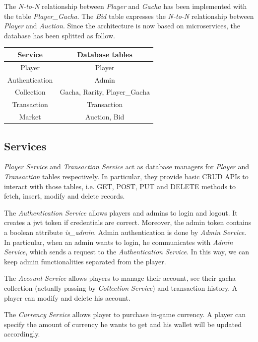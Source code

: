 \documentclass{article}
\begin{document}
The \emph{N-to-N} relationship between \emph{Player} and \emph{Gacha} has been implemented with the table \emph{Player\_Gacha}. The \emph{Bid} table expresses the \emph{N-to-N} relationship between \emph{Player} and \emph{Auction}. Since the architecture is now based on microservices, the database has been splitted as follow.
\begin{table}[ht!]
    \centering
    \begin{tabular}{|c|c|}
        \hline
        \textbf{Service} & \textbf{Database tables}     \\
        \hline
        Player           & Player                       \\
        Authentication   & Admin                        \\
        Collection       & Gacha, Rarity, Player\_Gacha \\
        Transaction      & Transaction                  \\
        Market           & Auction, Bid                 \\
        \hline
    \end{tabular}
\end{table}

\subsection{Services}
\emph{Player Service} and \emph{Transaction Service} act as database managers for \emph{Player} and \emph{Transaction} tables respectively. In particular, they provide basic CRUD APIs to interact with those tables, i.e. GET, POST, PUT and DELETE methods to fetch, insert, modify and delete records.

The \emph{Authentication Service} allows players and admins to login and logout. It creates a jwt token if credentials are correct. Moreover, the admin token contains a boolean attribute \emph{is\_admin}. Admin authentication is done by \emph{Admin Service}. In particular, when an admin wants to login, he communicates with \emph{Admin Service}, which sends a request to the \emph{Authentication Service}. In this way, we can keep admin functionalities separated from the player.

The \emph{Account Service} allows players to manage their account, see their gacha collection (actually passing by \emph{Collection Service}) and transaction history. A player can modify and delete his account.

The \emph{Currency Service} allows player to purchase in-game currency. A player can specify the amount of currency he wants to get and his wallet will be updated accordingly.
\end{document}
